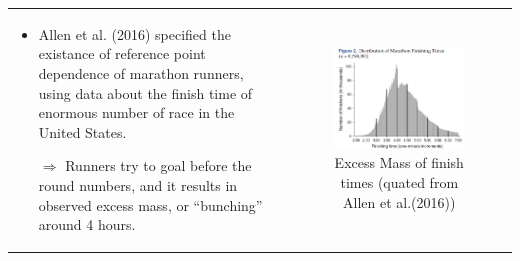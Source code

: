 \documentclass[dvipdfmx,12pt]{beamer}
\begin{document}
\begin{frame}
  \begin{tabular}{lc}
    \begin{minipage}[H]{0.45\textwidth}
      \begin{itemize}
        \small
        \item Allen et al. (2016) specified the existance of reference point dependence of marathon runners, using data about the finish time of enormous number of race in the United States.

        $\Rightarrow$ Runners try to goal before the round numbers, and it results in observed excess mass, or ``bunching'' around 4 hours.

      \end{itemize}

    \end{minipage} &
    \begin{minipage}[H]{0.5\textwidth}
      \begin{figure}
        \includegraphics[keepaspectratio, scale = 0.45]{graphs/Allen_fig2.png}
        \caption{Excess Mass of finish times (quated from Allen et al.(2016))}
        \label{allen}
      \end{figure}
    \end{minipage}
  \end{tabular}
\end{frame}
\end{document}
